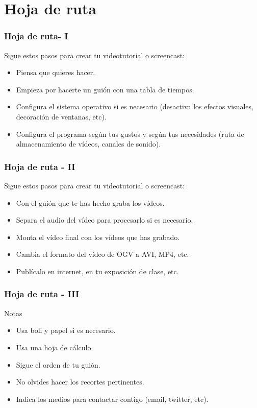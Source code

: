 \documentclass{beamer}
\begin{document}
	\section{Hoja de ruta}
		\begin{frame}
			\frametitle{Hoja de ruta- I}
			\justifying 
			Sigue estos pasos para crear tu videotutorial o screencast:
			\begin{itemize}
				\item <1-> Piensa que quieres hacer.
				\item <2-> Empieza por hacerte un guión con una tabla de tiempos. 
				\item <3-> Configura el sistema operativo si es necesario (desactiva los efectos visuales, decoración de ventanas, etc).
				\item <4-> Configura el programa según tus gustos y según tus necesidades (ruta de almacenamiento de vídeos, canales de sonido).
			\end{itemize}
		\end{frame}
		\begin{frame}
			\frametitle{Hoja de ruta - II}
			\justifying 
			Sigue estos pasos para crear tu videotutorial o screencast:
			\begin{itemize}
				\item <1-> Con el guión que te has hecho graba los vídeos.
				\item <2-> Separa el audio del vídeo para procesarlo si es necesario.
				\item <3-> Monta el vídeo final con los vídeos que has grabado.
				\item <4-> Cambia el formato del vídeo de OGV a AVI, MP4, etc.
				\item <5-> Publícalo en internet, en tu exposición de clase, etc.
			\end{itemize}
		\end{frame}
		\begin{frame}
			\frametitle{Hoja de ruta - III}
			\justifying 
			\Huge{Notas}
			\normalsize
			\begin{itemize}
				\item Usa boli y papel si es necesario.
				\item Usa una hoja de cálculo.
				\item Sigue el orden de tu guión.
				\item No olvides hacer los recortes pertinentes.
				\item Indica los medios para contactar contigo (email, twitter, etc).
			\end{itemize}
		\end{frame}
\end{document}
